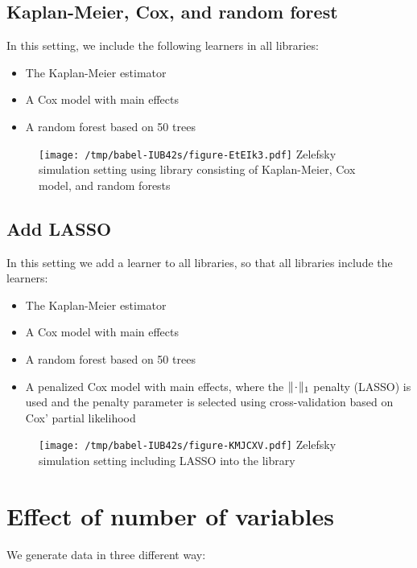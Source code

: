 \documentclass[a4paper,danish]{article}
\begin{document}
\clearpage

\subsection{Kaplan-Meier, Cox, and random forest}
\label{sec:org0516d66}
In this setting, we include the following learners in all libraries:

\begin{itemize}
\item The Kaplan-Meier estimator
\item A Cox model with main effects
\item A random forest based on 50 trees
\end{itemize}


\begin{figure}[htbp]
\centering
\texttt{[image: /tmp/babel-IUB42s/figure-EtEIk3.pdf]}
Zelefsky simulation setting using library consisting of Kaplan-Meier, Cox model, and random forests
\end{figure}

\clearpage

\subsection{Add LASSO}
\label{sec:orgd0d0620}
In this setting we add a learner to all libraries, so that all libraries include
the learners:

\begin{itemize}
\item The Kaplan-Meier estimator
\item A Cox model with main effects
\item A random forest based on 50 trees
\item A penalized Cox model with main effects, where the \(\|\blank\|_1\) penalty
(LASSO) is used and the penalty parameter is selected using cross-validation
based on Cox' partial likelihood
\end{itemize}

\begin{figure}[htbp]
\centering
\texttt{[image: /tmp/babel-IUB42s/figure-KMJCXV.pdf]}
Zelefsky simulation setting including LASSO into the library
\end{figure}

\clearpage


\section{Effect of number of variables}
\label{sec:orgf46a6e0}
We generate data in three different way:
\end{document}
